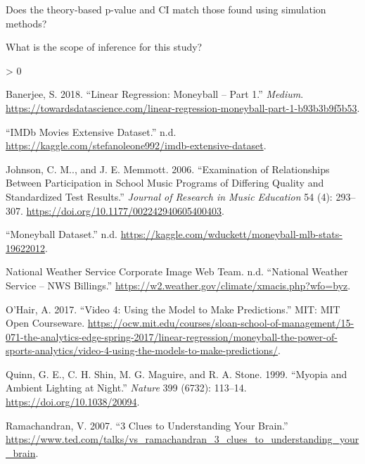 \documentclass[
]{report}
\newcommand{\rgi}{\hspace{24pt}}  %
\newlength{\cslhangindent}
\newenvironment{CSLReferences}[2] %
 {%
  \setlength{\parindent}{0pt}
  \ifodd #1 \everypar{\setlength{\hangindent}{\cslhangindent}}\ignorespaces\fi
  \ifnum #2 > 0
  \setlength{\parskip}{#2\baselineskip}
  \fi
 }%
 {}
\begin{document}
\rgi Does the theory-based p-value and CI match those found using simulation methods?

\vspace{0.8in}

\rgi What is the scope of inference for this study?

\vspace{0.8in}

\newpage

\hypertarget{refs}{}
\begin{CSLReferences}{1}{0}
\leavevmode\hypertarget{ref-banerjee2018}{}%
Banerjee, S. 2018. {``Linear Regression: Moneyball -- Part 1.''} \emph{Medium}. \url{https://towardsdatascience.com/linear-regression-moneyball-part-1-b93b3b9f5b53}.

\leavevmode\hypertarget{ref-imdb}{}%
{``{IMDb} Movies Extensive Dataset.''} n.d. \url{https://kaggle.com/stefanoleone992/imdb-extensive-dataset}.

\leavevmode\hypertarget{ref-johnson2006}{}%
Johnson, C. M.., and J. E. Memmott. 2006. {``Examination of Relationships Between Participation in School Music Programs of Differing Quality and Standardized Test Results.''} \emph{Journal of Research in Music Education} 54 (4): 293--307. \url{https://doi.org/10.1177/002242940605400403}.

\leavevmode\hypertarget{ref-moneyball}{}%
{``Moneyball Dataset.''} n.d. \url{https://kaggle.com/wduckett/moneyball-mlb-stats-19622012}.

\leavevmode\hypertarget{ref-weather}{}%
National Weather Service Corporate Image Web Team. n.d. {``National Weather Service -- {NWS} Billings.''} \url{https://w2.weather.gov/climate/xmacis.php?wfo=byz}.

\leavevmode\hypertarget{ref-ohair2017}{}%
O'Hair, A. 2017. {``Video 4: Using the Model to Make Predictions.''} {MIT}: {MIT Open Courseware}. \url{https://ocw.mit.edu/courses/sloan-school-of-management/15-071-the-analytics-edge-spring-2017/linear-regression/moneyball-the-power-of-sports-analytics/video-4-using-the-models-to-make-predictions/}.

\leavevmode\hypertarget{ref-quinn1999}{}%
Quinn, G. E., C. H. Shin, M. G. Maguire, and R. A. Stone. 1999. {``Myopia and Ambient Lighting at Night.''} \emph{Nature} 399 (6732): 113--14. \url{https://doi.org/10.1038/20094}.

\leavevmode\hypertarget{ref-ramachandran2007}{}%
Ramachandran, V. 2007. {``3 Clues to Understanding Your Brain.''} \url{https://www.ted.com/talks/vs_ramachandran_3_clues_to_understanding_your_brain}.


\end{CSLReferences}
\end{document}
